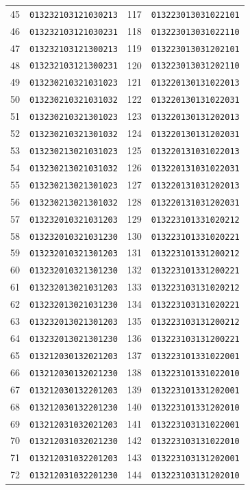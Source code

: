 \documentclass[aps,pra,reprint,superscriptaddress,longbibliography,nofootinbib,floatfix,10pt]{revtex4-2}
\theoremstyle{definition}
\begin{document}
\begin{longtable}{rl@{\qquad}rl}
45 & \texttt{013232103121030213} & 117 & \texttt{013223013031022101}\\
46 & \texttt{013232103121030231} & 118 & \texttt{013223013031022110}\\
47 & \texttt{013232103121300213} & 119 & \texttt{013223013031202101}\\
48 & \texttt{013232103121300231} & 120 & \texttt{013223013031202110}\\
49 & \texttt{013230210321031023} & 121 & \texttt{013220130131022013}\\
50 & \texttt{013230210321031032} & 122 & \texttt{013220130131022031}\\
51 & \texttt{013230210321301023} & 123 & \texttt{013220130131202013}\\
52 & \texttt{013230210321301032} & 124 & \texttt{013220130131202031}\\
53 & \texttt{013230213021031023} & 125 & \texttt{013220131031022013}\\
54 & \texttt{013230213021031032} & 126 & \texttt{013220131031022031}\\
55 & \texttt{013230213021301023} & 127 & \texttt{013220131031202013}\\
56 & \texttt{013230213021301032} & 128 & \texttt{013220131031202031}\\
57 & \texttt{013232010321031203} & 129 & \texttt{013223101331020212}\\
58 & \texttt{013232010321031230} & 130 & \texttt{013223101331020221}\\
59 & \texttt{013232010321301203} & 131 & \texttt{013223101331200212}\\
60 & \texttt{013232010321301230} & 132 & \texttt{013223101331200221}\\
61 & \texttt{013232013021031203} & 133 & \texttt{013223103131020212}\\
62 & \texttt{013232013021031230} & 134 & \texttt{013223103131020221}\\
63 & \texttt{013232013021301203} & 135 & \texttt{013223103131200212}\\
64 & \texttt{013232013021301230} & 136 & \texttt{013223103131200221}\\
65 & \texttt{013212030132021203} & 137 & \texttt{013223101331022001}\\
66 & \texttt{013212030132021230} & 138 & \texttt{013223101331022010}\\
67 & \texttt{013212030132201203} & 139 & \texttt{013223101331202001}\\
68 & \texttt{013212030132201230} & 140 & \texttt{013223101331202010}\\
69 & \texttt{013212031032021203} & 141 & \texttt{013223103131022001}\\
70 & \texttt{013212031032021230} & 142 & \texttt{013223103131022010}\\
71 & \texttt{013212031032201203} & 143 & \texttt{013223103131202001}\\
72 & \texttt{013212031032201230} & 144 & \texttt{013223103131202010}\\
\end{longtable}\endgroup
\end{document}
